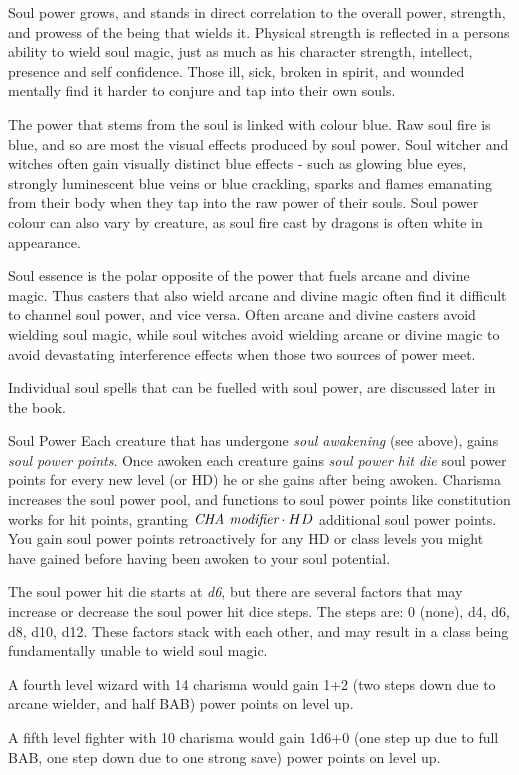 Soul power grows, and stands in direct correlation to the overall power,
strength, and prowess of the being that wields it. Physical strength is
reflected in a persons ability to wield soul magic, just as much as his
character strength, intellect, presence and self confidence. Those ill, sick,
broken in spirit, and wounded mentally find it harder to conjure and tap into
their own souls.

The power that stems from the soul is linked with colour blue. Raw soul fire
is blue, and so are most the visual effects produced by soul power. Soul
witcher and witches often gain visually distinct blue effects - such as
glowing blue eyes, strongly luminescent blue veins or blue crackling, sparks
and flames emanating from their body when they tap into the raw power of
their souls. Soul power colour can also vary by creature, as soul fire cast
by dragons is often white in appearance.

Soul essence is the polar opposite of the power that fuels arcane and divine
magic. Thus casters that also wield arcane and divine magic often find it
difficult to channel soul power, and vice versa. Often arcane and divine
casters avoid wielding soul magic, while soul witches avoid wielding arcane or
divine magic to avoid devastating interference effects when those two sources
of power meet.

Individual soul spells that can be fuelled with soul power, are discussed
later in the book.

\begin{35e}{Soul Power}
  Each creature that has undergone \emph{soul awakening} (see above), gains
  \emph{soul power points}. Once awoken each creature gains \emph{soul power
    hit die} soul power points for every new level (or HD) he or she gains after
  being awoken. Charisma increases the soul power pool, and functions to soul
  power points like constitution works for hit points, granting
  $ \emph{CHA modifier} \cdot HD $ additional soul power points. You gain soul
  power points retroactively for any HD or class levels you might have gained
  before having been awoken to your soul potential.

  The soul power hit die starts at \emph{d6}, but there are several factors
  that may increase or decrease the soul power hit dice steps. The steps are:
  0 (none), d4, d6, d8, d10, d12. These factors stack with each other, and may
  result in a class being fundamentally unable to wield soul magic.

  A fourth level wizard with 14 charisma would gain 1+2 (two steps down due to
  arcane wielder, and half BAB) power points on level up.

  A fifth level fighter with 10 charisma would gain 1d6+0 (one step up due to
  full BAB, one step down due to one strong save) power points on level up.
\end{35e}

